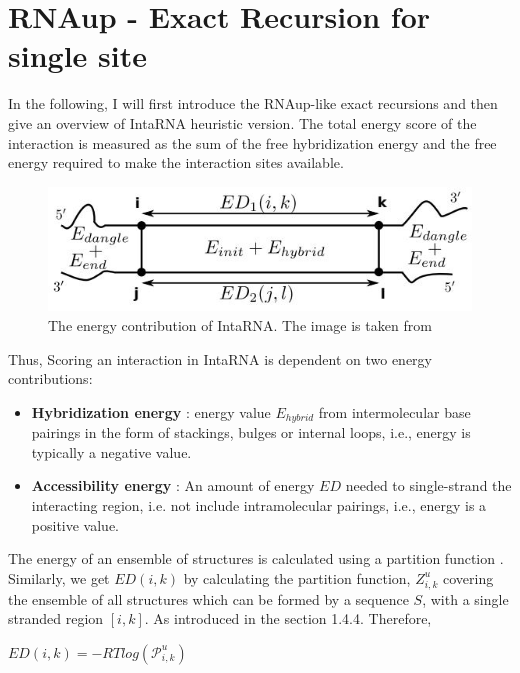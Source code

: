 \documentclass[twoside,a4paper]{report}
\numberwithin{equation}{section}
\begin{document}
	\section{RNAup - Exact Recursion for single site}
	
	In the following, I will first introduce the RNAup-like exact recursions \citep{muckstein2006thermodynamics} and then give an overview of IntaRNA heuristic version. The total energy score of the interaction is measured as the sum of the free hybridization energy and the free energy required to make the interaction sites available.\\
	
		\begin{figure}[tb]
		\includegraphics[width=0.6\linewidth]{inta}
		\centering
		\caption{ The energy contribution of IntaRNA. The image is taken from \citep{gelhausen2018constrained} } 
		\label{fig:inta}
	\end{figure}
	
	Thus, Scoring an interaction in IntaRNA is dependent on two energy contributions:\\
	
	\begin{itemize}
		\item \textbf{Hybridization energy} : energy value $E_{hybrid}$ from intermolecular base pairings in the form of stackings, bulges or internal loops, i.e., energy is typically a negative value. 
		\item \textbf{Accessibility energy} : An amount of energy  $ED $ needed to single-strand the interacting region, i.e. not include intramolecular pairings, i.e., energy is a positive value. 
	\end{itemize}
	
	
	The energy of an ensemble of structures is calculated using a partition function \citep{mccaskill1990equilibrium}. Similarly, we get $ED(i,k)$ by calculating the partition function, ${Z}_{i,k}^{u}$ covering the ensemble of all structures which can be formed by a sequence $S$, with a single stranded region $[i,k]$. As introduced in the section 1.4.4. Therefore,
	
		\begin{center}
		
		$ED(i,k) = - RTlog(\mathcal{P}_{i,k}^{u})$
		
	\end{center}
	
\end{document}
